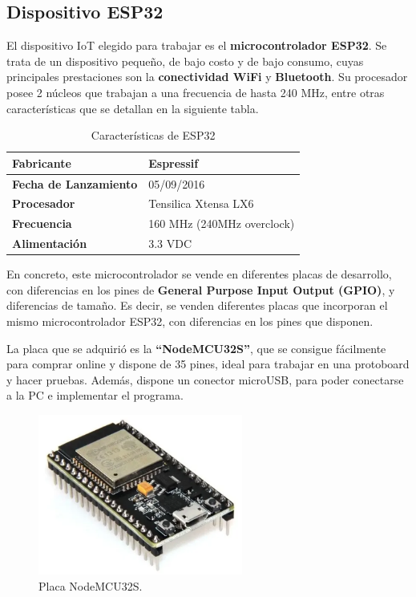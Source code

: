 \subsection{Dispositivo ESP32}
El dispositivo IoT elegido para trabajar es el \textbf{microcontrolador ESP32}. Se trata de un dispositivo pequeño, de bajo costo y de bajo consumo, cuyas principales prestaciones son la \textbf{conectividad WiFi} y \textbf{Bluetooth}. Su procesador posee 2 núcleos que trabajan a una frecuencia de hasta 240 MHz, entre otras características que se detallan en la siguiente tabla.

\begin{table}[h]
\begin{center}
\begin{tabular}{ll}
\hline
\multicolumn{1}{|l|}{\textbf{Fabricante}} & \multicolumn{1}{l|}{Espressif} \\ \hline
\multicolumn{1}{|l|}{\textbf{Fecha de Lanzamiento}} & \multicolumn{1}{l|}{05/09/2016} \\ \hline
\multicolumn{1}{|l|}{\textbf{Procesador}} & \multicolumn{1}{l|}{Tensilica Xtensa LX6} \\ \hline
\multicolumn{1}{|l|}{\textbf{Frecuencia}} & \multicolumn{1}{l|}{160 MHz (240MHz overclock)} \\ \hline
\multicolumn{1}{|l|}{\textbf{Alimentación}} & \multicolumn{1}{l|}{3.3 VDC} \\ \hline           
\end{tabular}
\caption{Características de ESP32}
\label{tab:car-esp32}
\end{center}
\end{table}

En concreto, este microcontrolador se vende en diferentes placas de desarrollo, con diferencias en los pines de \textbf{General Purpose Input Output (GPIO)}, y diferencias de tamaño. Es decir, se venden diferentes placas que incorporan el mismo microcontrolador ESP32, con diferencias en los pines que disponen.

La placa que se adquirió es la \textbf{“NodeMCU32S”}, que se consigue fácilmente para comprar online y dispone de 35 pines, ideal para trabajar en una protoboard y hacer pruebas. Además, dispone un conector microUSB, para poder conectarse a la PC e implementar el programa.

\begin{figure}[H]
    \centering
    \includegraphics[width=0.6\textwidth]{fig/esp32_1.png}
    \caption{Placa NodeMCU32S.}
    \label{fig:esp32_1}
\end{figure}

